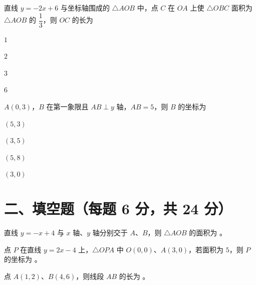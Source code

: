 \documentclass{exam-zh}
\begin{document}
\begin{question}[points=6]
  直线 $y=-2x+6$ 与坐标轴围成的 $\triangle AOB$ 中，点 $C$ 在 $OA$ 上使 $\triangle OBC$ 面积为 $\triangle AOB$ 的 $\dfrac{1}{3}$，则 $OC$ 的长为
  \begin{choices}
    \item $1$
    \item $2$
    \item $3$
    \item $6$
  \end{choices}
  \paren[A]
\end{question}



\begin{question}[points=6]
  $A(0,3)$，$B$ 在第一象限且 $AB \perp y$ 轴，$AB=5$，则 $B$ 的坐标为
  \begin{choices}
    \item $(5, 3)$
    \item $(3, 5)$
    \item $(5, 8)$
    \item $(3, 0)$
  \end{choices}
  \paren[A]
\end{question}


\section*{二、填空题（每题 6 分，共 24 分）}



\begin{question}[points=6]
  直线 $y=-x+4$ 与 $x$ 轴、$y$ 轴分别交于 $A$、$B$，则 $\triangle AOB$ 的面积为 \fillin。
  \fillin
  \paren[$8$]
\end{question}



\begin{question}[points=6]
  点 $P$ 在直线 $y=2x-4$ 上，$\triangle OPA$ 中 $O(0,0)$、$A(3,0)$，若面积为 $5$，则 $P$ 的坐标为 \fillin。
  \fillin
\end{question}



\begin{question}[points=6]
  点 $A(1,2)$、$B(4,6)$，则线段 $AB$ 的长为 \fillin。
  \fillin
  \paren[$5$]
\end{question}
\end{document}
